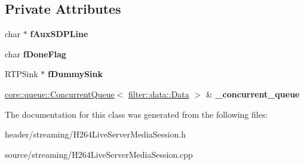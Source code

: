\subsection*{Private Attributes}
\begin{DoxyCompactItemize}
\item 
\mbox{\label{class_h264_live_server_media_session_ac1b94afe60e2b966d99353836eee30b0}} 
char $\ast$ {\bfseries f\+Aux\+S\+D\+P\+Line}
\item 
\mbox{\label{class_h264_live_server_media_session_a75e1b4db815f141d0014c04de1d6a811}} 
char {\bfseries f\+Done\+Flag}
\item 
\mbox{\label{class_h264_live_server_media_session_ac0d59fbfc90f27eecb30cad7e9c2aa57}} 
R\+T\+P\+Sink $\ast$ {\bfseries f\+Dummy\+Sink}
\item 
\mbox{\label{class_h264_live_server_media_session_a2bf1fca74e15b552e82eaa6925834512}} 
\hyperlink{classcore_1_1queue_1_1_concurrent_queue}{core\+::queue\+::\+Concurrent\+Queue}$<$ \hyperlink{classfilter_1_1data_1_1_data}{filter\+::data\+::\+Data} $>$ \& {\bfseries \+\_\+concurrent\+\_\+queue}
\end{DoxyCompactItemize}


The documentation for this class was generated from the following files\+:\begin{DoxyCompactItemize}
\item 
header/streaming/H264\+Live\+Server\+Media\+Session.\+h\item 
source/streaming/H264\+Live\+Server\+Media\+Session.\+cpp\end{DoxyCompactItemize}

